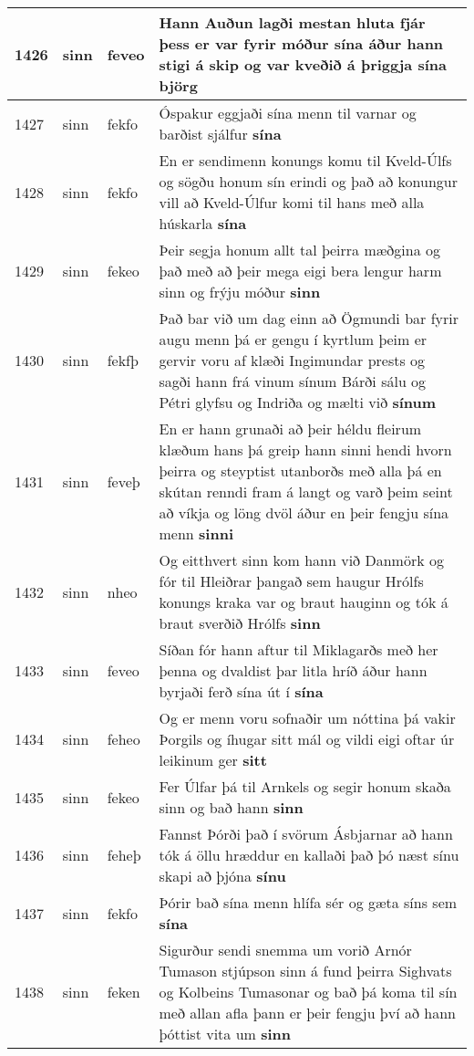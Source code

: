 \documentclass{article}
\begin{document}
\begin{longtable}{p{1cm}|p{1cm}|p{1cm}|p{13cm}}
\hline
1426&sinn&feveo&Hann Auðun lagði mestan hluta fjár þess er var fyrir móður sína áður hann stigi á skip og var kveðið á þriggja \textbf{sína} björg\\
\hline
1427&sinn&fekfo&Óspakur eggjaði sína menn til varnar og barðist sjálfur \textbf{sína} \\
\hline
1428&sinn&fekfo&En er sendimenn konungs komu til Kveld-Úlfs og sögðu honum sín erindi og það að konungur vill að Kveld-Úlfur komi til hans með alla húskarla \textbf{sína} \\
\hline
1429&sinn&fekeo&Þeir segja honum allt tal þeirra mæðgina og það með að þeir mega eigi bera lengur harm sinn og frýju móður \textbf{sinn} \\
\hline
1430&sinn&fekfþ&Það bar við um dag einn að Ögmundi bar fyrir augu menn þá er gengu í kyrtlum þeim er gervir voru af klæði Ingimundar prests og sagði hann frá vinum sínum Bárði sálu og Pétri glyfsu og Indriða og mælti við \textbf{sínum} \\
\hline
1431&sinn&feveþ&En er hann grunaði að þeir héldu fleirum klæðum hans þá greip hann sinni hendi hvorn þeirra og steyptist utanborðs með alla þá en skútan renndi fram á langt og varð þeim seint að víkja og löng dvöl áður en þeir fengju sína menn \textbf{sinni} \\
\hline
1432&sinn&nheo&Og eitthvert sinn kom hann við Danmörk og fór til Hleiðrar þangað sem haugur Hrólfs konungs kraka var og braut hauginn og tók á braut sverðið Hrólfs \textbf{sinn} \\
\hline
1433&sinn&feveo&Síðan fór hann aftur til Miklagarðs með her þenna og dvaldist þar litla hríð áður hann byrjaði ferð sína út í \textbf{sína} \\
\hline
1434&sinn&feheo&Og er menn voru sofnaðir um nóttina þá vakir Þorgils og íhugar sitt mál og vildi eigi oftar úr leikinum ger \textbf{sitt} \\
\hline
1435&sinn&fekeo&Fer Úlfar þá til Arnkels og segir honum skaða sinn og bað hann \textbf{sinn} \\
\hline
1436&sinn&feheþ&Fannst Þórði það í svörum Ásbjarnar að hann tók á öllu hræddur en kallaði það þó næst sínu skapi að þjóna \textbf{sínu} \\
\hline
1437&sinn&fekfo&Þórir bað sína menn hlífa sér og gæta síns sem \textbf{sína} \\
\hline
1438&sinn&feken&Sigurður sendi snemma um vorið Arnór Tumason stjúpson sinn á fund þeirra Sighvats og Kolbeins Tumasonar og bað þá koma til sín með allan afla þann er þeir fengju því að hann þóttist vita um \textbf{sinn} \\

\end{longtable}
\end{document}
